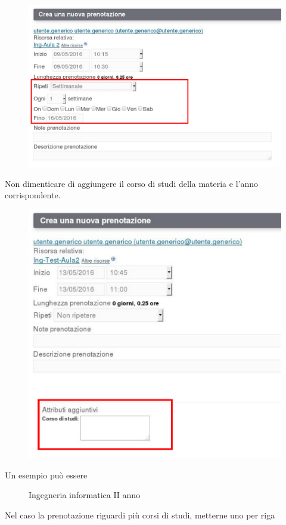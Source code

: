 \begin{figure}[H]
\centering{}\includegraphics[scale=0.5]{Immagini/prenotazione_ripetizione_2.pdf}
\normalsize
\caption{}
\label{fig:prenotazione_ripetizione_2.pdf}
\end{figure}


Non dimenticare di aggiungere il corso di studi della materia e l'anno corrispondente.


\begin{figure}[H]
\centering{}\includegraphics[scale=0.5]{Immagini/prenotazione_attributi.pdf}
\normalsize
\caption{}
\label{fig:prenotazione_attributi.pdf}
\end{figure}

Un esempio può essere

\begin{figure}[H]
 \centering{} Ingegneria informatica II anno
\normalsize
\end{figure}

Nel caso la prenotazione riguardi più corsi di studi, metterne uno per riga